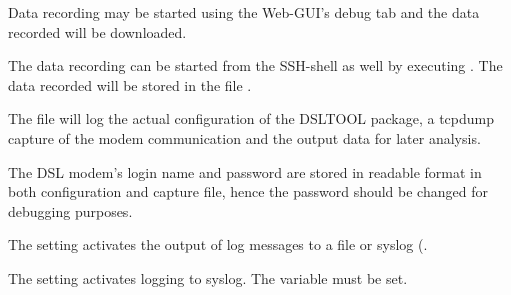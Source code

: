 \begin{description}
  Data recording may be started using the Web-GUI's debug tab and the
  data recorded will be downloaded.

  The data recording can be started from the SSH-shell as well by executing
  .
  The data recorded will be stored in the file .

  The file  will log the actual configuration of the DSLTOOL package,
  a tcpdump capture of the modem communication and the output data for later analysis.

  The DSL modem's login name and password are stored in readable format
  in both configuration and capture file, hence the password should be changed for
  debugging purposes.


  The setting   activates the output of log messages to a file
  or syslog (.


  The setting  activates logging to syslog.
  The variable  must be set.

\end{description}

